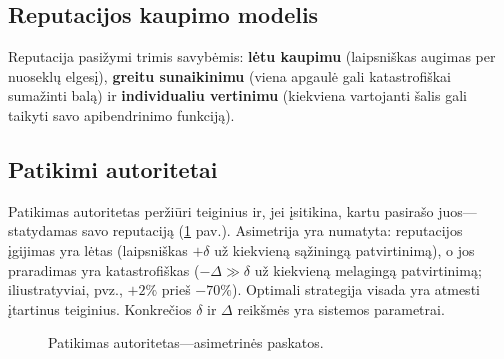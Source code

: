 \documentclass[11pt,a4paper,twocolumn]{article}
\begin{document}
\subsection{Reputacijos kaupimo modelis}

Reputacija pasižymi trimis savybėmis: \textbf{lėtu kaupimu} (laipsniškas augimas per nuoseklų elgesį), \textbf{greitu sunaikinimu} (viena apgaulė gali katastrofiškai sumažinti balą) ir \textbf{individualiu vertinimu} (kiekviena vartojanti šalis gali taikyti savo apibendrinimo funkciją).

\subsection{Patikimi autoritetai}

Patikimas autoritetas peržiūri teiginius ir, jei įsitikina, kartu pasirašo juos---statydamas savo reputaciją (\ref{fig:authority} pav.). Asimetrija yra numatyta: reputacijos įgijimas yra lėtas (laipsniškas $+\delta$ už kiekvieną sąžiningą patvirtinimą), o jos praradimas yra katastrofiškas ($-\Delta \gg \delta$ už kiekvieną melagingą patvirtinimą; iliustratyviai, pvz., $+2\%$ prieš $-70\%$). Optimali strategija visada yra atmesti įtartinus teiginius. Konkrečios $\delta$ ir $\Delta$ reikšmės yra sistemos parametrai.

\begin{figure}[ht]
\centering
{}
\caption{Patikimas autoritetas---asimetrinės paskatos.}
\label{fig:authority}
\end{figure}
\end{document}
